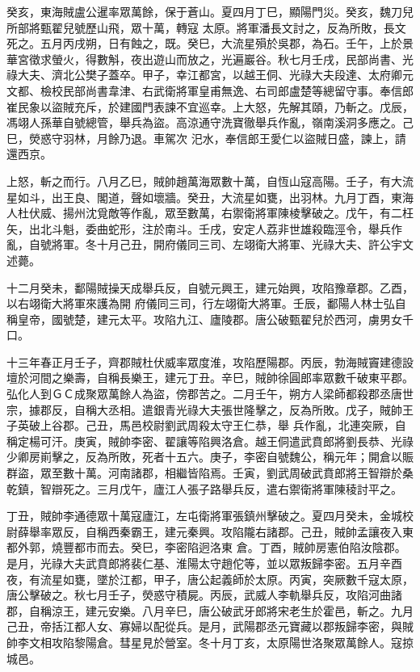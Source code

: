 \begin{pinyinscope}
 癸亥，東海賊盧公暹率眾萬餘，保于蒼山。夏四月丁巳，顯陽門災。癸亥，魏刀兒所部將甄翟兒號歷山飛，眾十萬，轉寇
 太原。將軍潘長文討之，反為所敗，長文死之。五月丙戌朔，日有蝕之，既。癸巳，大流星殞於吳郡，為石。壬午，上於景華宮徵求螢火，得數斛，夜出遊山而放之，光遍巖谷。秋七月壬戌，民部尚書、光祿大夫、濟北公樊子蓋卒。甲子，幸江都宮，以越王侗、光祿大夫段達、太府卿元文都、檢校民部尚書韋津、右武衛將軍皇甫無逸、右司郎盧楚等總留守事。奉信郎崔民象以盜賊充斥，於建國門表諫不宜巡幸。上大怒，先解其頤，乃斬之。戊辰，馮翊人孫華自號總管，舉兵為盜。高涼通守洗寶徹舉兵作亂，嶺南溪洞多應之。己巳，熒惑守羽林，月餘乃退。車駕次
 汜水，奉信郎王愛仁以盜賊日盛，諫上，請還西京。



 上怒，斬之而行。八月乙巳，賊帥趙萬海眾數十萬，自恆山寇高陽。壬子，有大流星如斗，出王良、閣道，聲如壞牆。癸丑，大流星如甕，出羽林。九月丁酉，東海人杜伏威、揚州沈覓敵等作亂，眾至數萬，右禦衛將軍陳棱擊破之。戊午，有二枉矢，出北斗魁，委曲蛇形，注於南斗。壬戌，安定人荔非世雄殺臨涇令，舉兵作亂，自號將軍。冬十月己丑，開府儀同三司、左翊衛大將軍、光祿大夫、許公宇文述薨。



 十二月癸未，鄱陽賊操天成舉兵反，自號元興王，建元始興，攻陷豫章郡。乙酉，以右翊衛大將軍來護為開
 府儀同三司，行左翊衛大將軍。壬辰，鄱陽人林士弘自稱皇帝，國號楚，建元太平。攻陷九江、廬陵郡。唐公破甄翟兒於西河，虜男女千口。



 十三年春正月壬子，齊郡賊杜伏威率眾度淮，攻陷歷陽郡。丙辰，勃海賊竇建德設壇於河間之樂壽，自稱長樂王，建元丁丑。辛巳，賊帥徐圓郎率眾數千破東平郡。弘化人到ＧＣ成聚眾萬餘人為盜，傍郡苦之。二月壬午，朔方人梁師都殺郡丞唐世宗，據郡反，自稱大丞相。遣銀青光祿大夫張世隆擊之，反為所敗。戊子，賊帥王子英破上谷郡。己丑，馬邑校尉劉武周殺太守王仁恭，舉
 兵作亂，北連突厥，自稱定楊可汗。庚寅，賊帥李密、翟讓等陷興洛倉。越王侗遣武賁郎將劉長恭、光祿少卿房崱擊之，反為所敗，死者十五六。庚子，李密自號魏公，稱元年；開倉以賑群盜，眾至數十萬。河南諸郡，相繼皆陷焉。壬寅，劉武周破武賁郎將王智辯於桑乾鎮，智辯死之。三月戊午，廬江人張子路舉兵反，遣右禦衛將軍陳稜討平之。



 丁丑，賊帥李通德眾十萬寇廬江，左屯衛將軍張鎮州擊破之。夏四月癸未，金城校尉薛舉率眾反，自稱西秦霸王，建元秦興。攻陷隴右諸郡。己丑，賊帥孟讓夜入東都外郭，燒豐都市而去。癸巳，李密陷迥洛東
 倉。丁酉，賊帥房憲伯陷汝陰郡。是月，光祿大夫武賁郎將裴仁基、淮陽太守趙佗等，並以眾叛歸李密。五月辛酉夜，有流星如甕，墜於江都，甲子，唐公起義師於太原。丙寅，突厥數千寇太原，唐公擊破之。秋七月壬子，熒惑守積屍。丙辰，武威人李軌舉兵反，攻陷河曲諸郡，自稱涼王，建元安樂。八月辛巳，唐公破武牙郎將宋老生於霍邑，斬之。九月己丑，帝括江都人女、寡婦以配從兵。是月，武陽郡丞元寶藏以郡叛歸李密，與賊帥李文相攻陷黎陽倉。彗星見於營室。冬十月丁亥，太原陽世洛聚眾萬餘人。寇掠城邑。




\end{pinyinscope}
